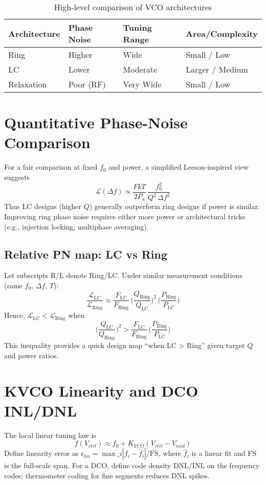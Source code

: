 \begin{table}[H]
  \centering
  \begin{tabular}{llll}
    \toprule
    Architecture & Phase Noise & Tuning Range & Area/Complexity \\
    \midrule
    Ring & Higher & Wide & Small / Low \\
    LC & Lower & Moderate & Larger / Medium \\
    Relaxation & Poor (RF) & Very Wide & Small / Low \\
    \bottomrule
  \end{tabular}
  \caption{High-level comparison of VCO architectures}
\end{table}

\section{Quantitative Phase-Noise Comparison}
For a fair comparison at fixed \(f_0\) and power, a simplified Leeson-inspired view suggests
\[
 \mathcal{L}(\Delta f) \propto \frac{F k T}{2 P_s}\,\frac{f_0^2}{Q^2\,\Delta f^2}
\]
Thus LC designs (higher \(Q\)) generally outperform ring designs if power is similar. Improving ring phase noise requires either more power or architectural tricks (e.g., injection locking, multiphase averaging).

\subsection*{Relative PN map: LC vs Ring}
Let subscripts R/L denote Ring/LC. Under similar measurement conditions (same \(f_0,\,\Delta f,\,T\)):
\[
 \frac{\mathcal{L}_\mathrm{LC}}{\mathcal{L}_\mathrm{Ring}} \approx \frac{F_\mathrm{LC}}{F_\mathrm{Ring}}\,\Big(\frac{Q_\mathrm{Ring}}{Q_\mathrm{LC}}\Big)^2\,\Big(\frac{P_\mathrm{Ring}}{P_\mathrm{LC}}\Big)
\]
Hence, \(\mathcal{L}_\mathrm{LC}<\mathcal{L}_\mathrm{Ring}\) when
\[
 \Big(\frac{Q_\mathrm{LC}}{Q_\mathrm{Ring}}\Big)^2 > \frac{F_\mathrm{LC}}{F_\mathrm{Ring}}\,\Big(\frac{P_\mathrm{Ring}}{P_\mathrm{LC}}\Big)
\]
This inequality provides a quick design map “when LC > Ring” given target \(Q\) and power ratios.

\section{KVCO Linearity and DCO INL/DNL}
The local linear tuning law is
\[
 f(V_{ctrl}) \approx f_0 + K_{VCO}(V_{ctrl}-V_{mid})
\]
Define linearity error as \(\epsilon_{lin} = \max\_i |f_i - \hat{f}_i|/\text{FS}\), where \(\hat{f}_i\) is a linear fit and FS is the full-scale span. For a DCO, define code density DNL/INL on the frequency codes; thermometer coding for fine segments reduces DNL spikes.

